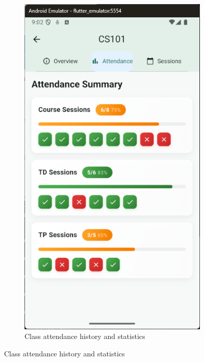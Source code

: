\vspace{0.5cm}
\begin{figure}[H]
    \centering
    \begin{subfigure}[b]{0.35\textwidth}
        \includegraphics[width=\textwidth]{images/rachid/student-side-courses-home-classAttendance-3.png}
        \caption{Class attendance history and statistics}
    \end{subfigure}

\end{figure}
